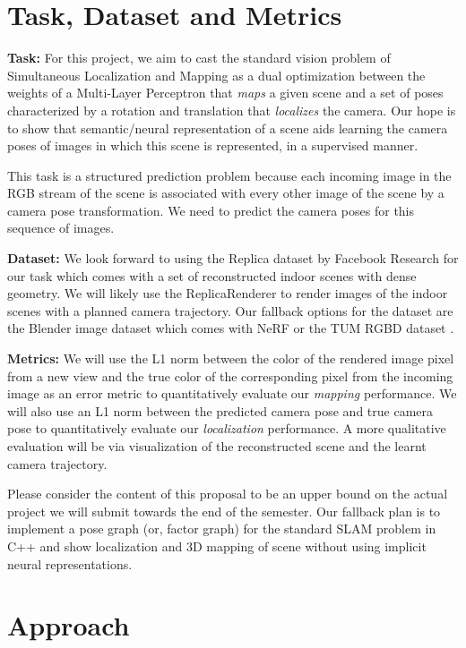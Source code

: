 \documentclass[15pt,letterpaper]{article}
\begin{document}
\section{Task, Dataset and Metrics}%
\label{sec:Task, Dataset and Metrics}
{\bf Task:} For this project, we aim to cast the standard vision problem of Simultaneous Localization and Mapping as a dual optimization between the weights of a Multi-Layer Perceptron that {\em maps} a given scene and a set of poses characterized by a rotation and translation that {\em localizes} the camera. Our hope is to show that semantic/neural representation of a scene aids learning the camera poses of images in which this scene is represented, in a supervised manner.

This task is a structured prediction problem because each incoming image in the RGB stream of the scene is associated with every other image of the scene by a camera pose transformation. We need to predict the camera poses for this sequence of images.

{\bf Dataset:} We look forward to using the Replica dataset \cite{???} by Facebook Research for our task which comes with a set of reconstructed indoor scenes with dense geometry. We will likely use the ReplicaRenderer to render images of the indoor scenes with a planned camera trajectory. Our fallback options for the dataset are the Blender image dataset which comes with NeRF \cite{nerf} or the TUM RGBD dataset \cite{???}. 

{\bf Metrics:} We will use the L1 norm between the color of the rendered image pixel from a new view and the true color of the corresponding pixel from the incoming image as an error metric to quantitatively evaluate our {\em mapping} performance. We will also use an L1 norm between the predicted camera pose and true camera pose to quantitatively evaluate our {\em localization} performance. A more qualitative evaluation will be via visualization of the reconstructed scene and the learnt camera trajectory.

Please consider the content of this proposal to be an upper bound on the actual project we will submit towards the end of the semester. Our fallback plan is to implement a pose graph (or, factor graph) for the standard SLAM problem in C++ and show localization and 3D mapping of scene without using implicit neural representations. 

\section{Approach}%
\label{sec:Approach}
\end{document}
